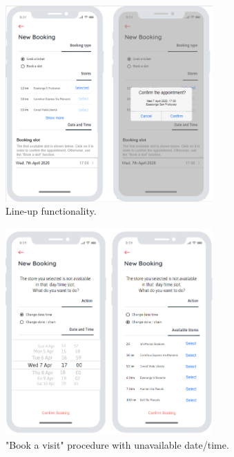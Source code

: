 \documentclass[table, 12pt]{article}
\begin{document}
\begin{flushleft}
    \begin{figure}[H]
        \begin{center}
            \includegraphics[width=225pt]{assets/mock_line_up.png}
            \caption{Line-up functionality.}
            \label{mock_new_booking}
        \end{center}
    \end{figure}

    \begin{figure}[H]
        \begin{center}
            \includegraphics[width=225pt]{assets/mock_new_booking_unavailable.png}
            \caption{"Book a visit" procedure with unavailable date/time.}
            \label{mock_new_booking_unavailable}
        \end{center}
    \end{figure}


\end{flushleft}
\end{document}
